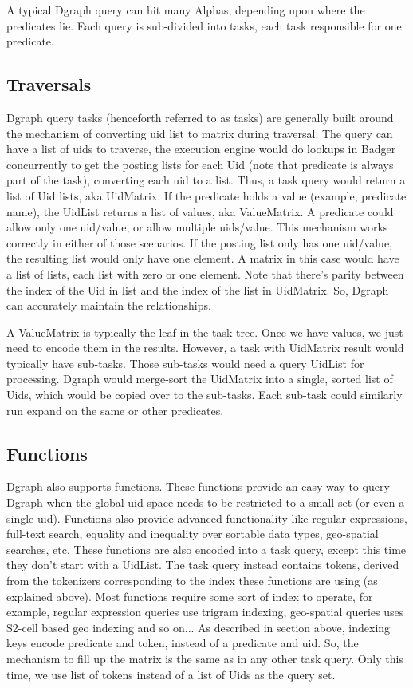 \documentclass[letterpaper,twocolumn,10pt]{article}
\begin{document}
A typical Dgraph query can hit many Alphas, depending upon where the
predicates lie. Each query is sub-divided into tasks, each task
responsible for one predicate.

\subsection{Traversals}

Dgraph query tasks (henceforth referred to as tasks) are generally built around
the mechanism of converting uid list to matrix during traversal. The query can
have a list of uids to traverse, the execution engine would do lookups in Badger
concurrently to get the posting lists for each Uid (note that predicate is
always part of the task), converting each uid to a list. Thus, a task query
would return a list of Uid lists, aka UidMatrix. If the predicate holds a value
(example, predicate name), the UidList returns a list of values, aka
ValueMatrix. A predicate could allow only one uid/value, or allow multiple
uids/value. This mechanism works correctly in either of those scenarios. If the
posting list only has one uid/value, the resulting list would only have one
element. A matrix in this case would have a list of lists, each list with zero
or one element. Note that there's parity between the index of the Uid in list
and the index of the list in UidMatrix. So, Dgraph can accurately maintain the
relationships.

A ValueMatrix is typically the leaf in the task tree. Once we have values, we
just need to encode them in the results. However, a task with UidMatrix result would
typically have sub-tasks. Those sub-tasks would need a query UidList for
processing. Dgraph would merge-sort the UidMatrix into a single, sorted list of
Uids, which would be copied over to the sub-tasks. Each sub-task could similarly
run expand on the same or other predicates.

\subsection{Functions}

Dgraph also supports functions. These functions provide an easy way to query
Dgraph when the global uid space needs to be restricted to a small set (or even
a single uid). Functions also provide advanced functionality like regular
expressions, full-text search, equality and inequality over sortable data types,
geo-spatial searches, etc. These functions are also encoded into a task query,
except this time they don't start with a UidList. The task query instead
contains tokens, derived from the tokenizers corresponding to the index these
functions are using (as explained above). Most functions require some sort of
index to operate, for example, regular expression queries use trigram indexing,
geo-spatial queries uses S2-cell based geo indexing and so on...  As described
in section above, indexing keys encode predicate and token, instead of a
predicate and uid. So, the mechanism to fill up the matrix is the same as in any
other task query. Only this time, we use list of tokens instead of a list of
Uids as the query set.
\end{document}
